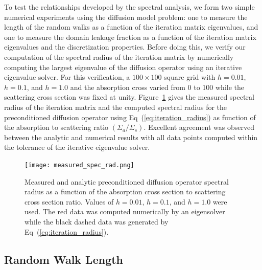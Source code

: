 \documentclass[preprint,11pt]{elsarticle}
\begin{document}
To test the relationships developed by the spectral analysis, we form
two simple numerical experiments using the diffusion model problem:
one to measure the length of the random walks as a function of the
iteration matrix eigenvalues, and one to measure the domain leakage
fraction as a function of the iteration matrix eigenvalues and the
discretization properties. Before doing this, we verify our
computation of the spectral radius of the iteration matrix by
numerically computing the largest eigenvalue of the diffusion operator
using an iterative eigenvalue solver. For this verification, a $100
\times 100$ square grid with $h=0.01$, $h=0.1$, and $h=1.0$ and the
absorption cross varied from 0 to 100 while the scattering cross
section was fixed at unity. Figure~\ref{fig:measured_spec_rad} gives
the measured spectral radius of the iteration matrix and the computed
spectral radius for the preconditioned diffusion operator using
Eq~(\ref{eq:iteration_radius}) as function of the absorption to
scattering ratio $(\Sigma_a / \Sigma_s)$. Excellent agreement was
observed between the analytic and numerical results with all data
points computed within the tolerance of the iterative eigenvalue
solver.
\begin{figure}[ht!]
  \begin{center}
    \texttt{[image: measured\_spec\_rad.png]}
  \end{center}
  \caption{Measured and analytic preconditioned diffusion operator
    spectral radius as a function of the absorption cross section to
    scattering cross section ratio. Values of $h=0.01$, $h=0.1$, and
    $h=1.0$ were used. The red data was computed numerically by an
    eigensolver while the black dashed data was generated by
    Eq~(\ref{eq:iteration_radius}).}
  \label{fig:measured_spec_rad}
\end{figure}

\subsection{Random Walk Length}
\label{subsec:walk_length}
\end{document}
